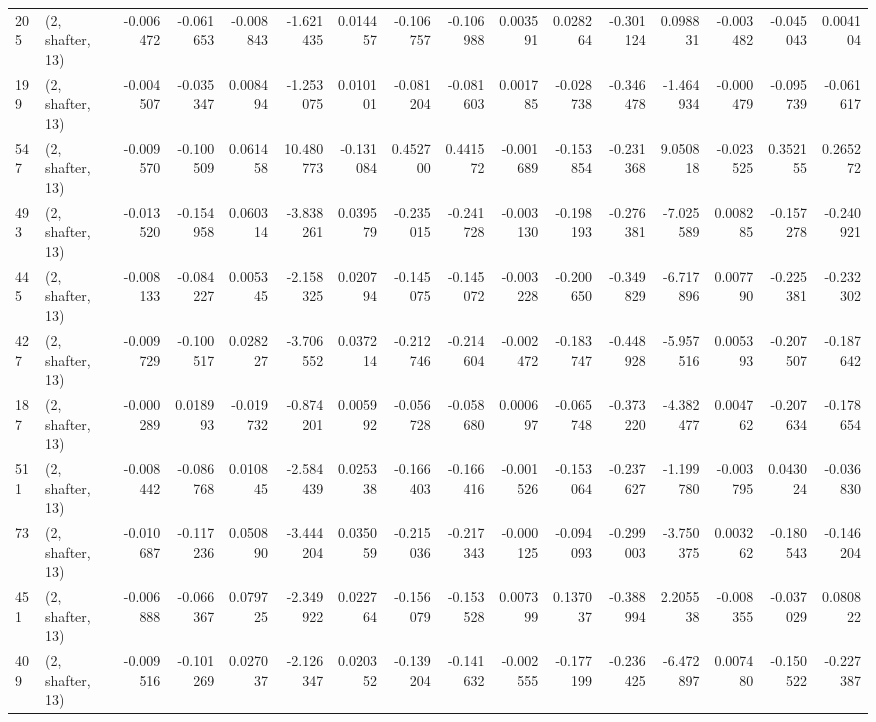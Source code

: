 \begin{tabular}{llrrrrrrrrrrrrrr}
205 &  (2, shafter, 13) &  -0.006472 & -0.061653 & -0.008843 &   -1.621435 &  0.014457 &  -0.106757 &  -0.106988 &  0.003591 &  0.028264 & -0.301124 &    0.098831 & -0.003482 &  -0.045043 &   0.004104 \\
199 &  (2, shafter, 13) &  -0.004507 & -0.035347 &  0.008494 &   -1.253075 &  0.010101 &  -0.081204 &  -0.081603 &  0.001785 & -0.028738 & -0.346478 &   -1.464934 & -0.000479 &  -0.095739 &  -0.061617 \\
547 &  (2, shafter, 13) &  -0.009570 & -0.100509 &  0.061458 &   10.480773 & -0.131084 &   0.452700 &   0.441572 & -0.001689 & -0.153854 & -0.231368 &    9.050818 & -0.023525 &   0.352155 &   0.265272 \\
493 &  (2, shafter, 13) &  -0.013520 & -0.154958 &  0.060314 &   -3.838261 &  0.039579 &  -0.235015 &  -0.241728 & -0.003130 & -0.198193 & -0.276381 &   -7.025589 &  0.008285 &  -0.157278 &  -0.240921 \\
445 &  (2, shafter, 13) &  -0.008133 & -0.084227 &  0.005345 &   -2.158325 &  0.020794 &  -0.145075 &  -0.145072 & -0.003228 & -0.200650 & -0.349829 &   -6.717896 &  0.007790 &  -0.225381 &  -0.232302 \\
427 &  (2, shafter, 13) &  -0.009729 & -0.100517 &  0.028227 &   -3.706552 &  0.037214 &  -0.212746 &  -0.214604 & -0.002472 & -0.183747 & -0.448928 &   -5.957516 &  0.005393 &  -0.207507 &  -0.187642 \\
187 &  (2, shafter, 13) &  -0.000289 &  0.018993 & -0.019732 &   -0.874201 &  0.005992 &  -0.056728 &  -0.058680 &  0.000697 & -0.065748 & -0.373220 &   -4.382477 &  0.004762 &  -0.207634 &  -0.178654 \\
511 &  (2, shafter, 13) &  -0.008442 & -0.086768 &  0.010845 &   -2.584439 &  0.025338 &  -0.166403 &  -0.166416 & -0.001526 & -0.153064 & -0.237627 &   -1.199780 & -0.003795 &   0.043024 &  -0.036830 \\
73  &  (2, shafter, 13) &  -0.010687 & -0.117236 &  0.050890 &   -3.444204 &  0.035059 &  -0.215036 &  -0.217343 & -0.000125 & -0.094093 & -0.299003 &   -3.750375 &  0.003262 &  -0.180543 &  -0.146204 \\
451 &  (2, shafter, 13) &  -0.006888 & -0.066367 &  0.079725 &   -2.349922 &  0.022764 &  -0.156079 &  -0.153528 &  0.007399 &  0.137037 & -0.388994 &    2.205538 & -0.008355 &  -0.037029 &   0.080822 \\
409 &  (2, shafter, 13) &  -0.009516 & -0.101269 &  0.027037 &   -2.126347 &  0.020352 &  -0.139204 &  -0.141632 & -0.002555 & -0.177199 & -0.236425 &   -6.472897 &  0.007480 &  -0.150522 &  -0.227387 \\

\end{tabular}
